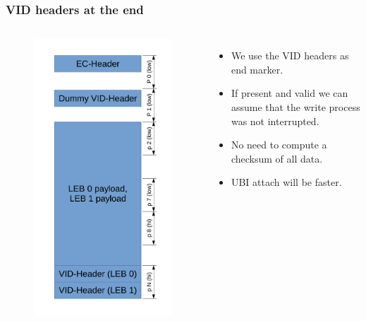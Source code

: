\documentclass[aspectratio=169,obeyspaces,spaces,hyphens,dvipsnames]{beamer}
\begin{document}
\begin{frame}[fragile]
\frametitle{VID headers at the end}
   \begin{columns}
     \begin{figure}
     \includegraphics[scale=0.33]{ubi_mlc_conso_dummy.pdf}
     \end{figure}
    \begin{itemize}
    \item We use the VID headers as end marker.
    \item If present and valid we can assume that the write process was not interrupted.
    \item No need to compute a checksum of all data.
    \item UBI attach will be faster.
    \end{itemize}
   \end{columns}
\end{frame}
\end{document}
